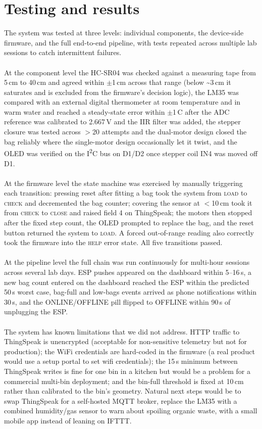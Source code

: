 \documentclass{article}
\begin{document}
\fi

\section{Testing and results}
\label{sec:testing}

The system was tested at three levels: individual components, the device-side firmware, and the full end-to-end pipeline, with tests repeated across multiple lab sessions to catch intermittent failures.
\\ \\
At the component level the HC-SR04 was checked against a measuring tape from 5\,cm to 40\,cm and agreed within $\pm$1\,cm across that range (below \textasciitilde 3\,cm it saturates and is excluded from the firmware's decision logic), the LM35 was compared with an external digital thermometer at room temperature and in warm water and reached a steady-state error within $\pm$1\,\textdegree C after the ADC reference was calibrated to 2.667\,V and the IIR filter was added, the stepper closure was tested across $>$20 attempts and the dual-motor design closed the bag reliably where the single-motor design occasionally let it twist, and the OLED was verified on the I\textsuperscript{2}C bus on D1/D2 once stepper coil IN4 was moved off D1.
\\ \\
At the firmware level the state machine was exercised by manually triggering each transition: pressing reset after fitting a bag took the system from \textsc{load} to \textsc{check} and decremented the bag counter; covering the sensor at $<$10\,cm took it from \textsc{check} to \textsc{close} and raised field 4 on ThingSpeak; the motors then stopped after the fixed step count, the OLED prompted to replace the bag, and the reset button returned the system to \textsc{load}. A forced out-of-range reading also correctly took the firmware into the \textsc{help} error state. All five transitions passed.
\\ \\
At the pipeline level the full chain was run continuously for multi-hour sessions across several lab days. ESP pushes appeared on the dashboard within 5--16\,s, a new bag count entered on the dashboard reached the ESP within the predicted 50\,s worst case, bag-full and low-bags events arrived as phone notifications within 30\,s, and the ONLINE/OFFLINE pill flipped to OFFLINE within 90\,s of unplugging the ESP.
\\ \\
The system has known limitations that we did not address. HTTP traffic to ThingSpeak is unencrypted (acceptable for non-sensitive telemetry but not for production); the WiFi credentials are hard-coded in the firmware (a real product would use a setup portal to set wifi credentials); the 15\,s minimum between ThingSpeak writes is fine for one bin in a kitchen but would be a problem for a commercial multi-bin deployment; and the bin-full threshold is fixed at 10\,cm rather than calibrated to the bin's geometry. Natural next steps would be to swap ThingSpeak for a self-hosted MQTT broker, replace the LM35 with a combined humidity/gas sensor to warn about spoiling organic waste, with a small mobile app instead of leaning on IFTTT.

\ifdefined\mainfile\else
\end{document}

